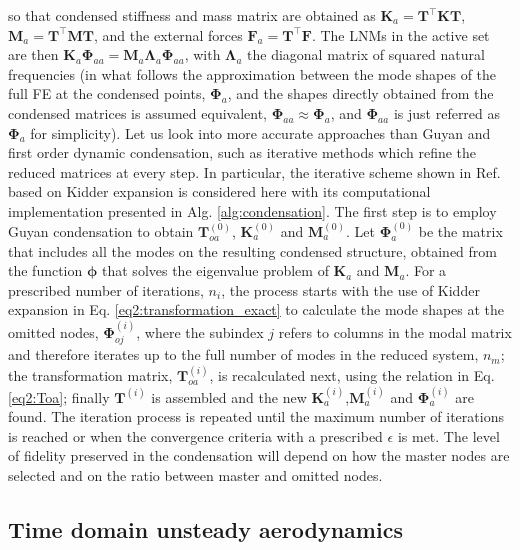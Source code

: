 \documentclass[11pt]{article}
\begin{document}
so that condensed stiffness and mass matrix are obtained as $\pmb{K}_a = \pmb{T}^\top\pmb{K}\pmb{T}$, $\pmb{M}_a = \pmb{T}^\top\pmb{M}\pmb{T}$, and the external forces $\bm{F}_a = \bm{T}^\top \bm{F}$. The LNMs in the active set are then $\pmb{K}_a\pmb{\Phi}_{aa}=\pmb{M}_a\pmb{\Lambda}_a\pmb{\Phi}_{aa}$, with $\pmb{\Lambda}_a$ the diagonal matrix of squared natural frequencies (in what follows the approximation between the mode shapes of the full FE at the condensed points, $\pmb{\Phi}_{a}$, and the shapes directly obtained from the condensed matrices is assumed equivalent, $\pmb{\Phi}_{aa} \approx \pmb{\Phi}_{a}$, and $\pmb{\Phi}_{aa}$ is just referred as $\pmb{\Phi}_{a}$  for simplicity).
Let us look into more accurate approaches than Guyan and first order dynamic condensation, such as iterative methods which refine the reduced matrices at every step. In particular, the iterative scheme shown in Ref.  based on Kidder expansion is considered here with its computational implementation presented in Alg. \eqref{alg:condensation}. The first step is to employ Guyan condensation to obtain $\pmb{T}_{oa}^{(0)}$, $\pmb{K}_a^{(0)}$ and $\pmb{M}_a^{(0)}$. Let $\pmb{\Phi}_{a}^{(0)}$ be the matrix that includes all the modes on the resulting condensed structure, obtained from the function $\bm{\phi}$ that solves the eigenvalue problem of $\pmb{K}_a$ and $\pmb{M}_a$. For a prescribed number of iterations, $n_i$, the process starts with the use of Kidder expansion in Eq. \eqref{eq2:transformation_exact} to calculate the mode shapes at the omitted nodes, $\pmb{\Phi}_{oj}^{(i)}$, where the subindex $j$ refers to columns in the modal matrix and therefore iterates up to the full number of modes in the reduced system, $n_m$; the transformation matrix, $\pmb{T}_{oa}^{(i)}$, is recalculated next, using the relation in Eq. \eqref{eq2:Toa}; finally $\bm{T}^{(i)}$ is assembled and the new $\pmb{K}_a^{(i)}$,$\pmb{M}_a^{(i)}$ and  $\pmb{\Phi}_{a}^{(i)}$ are found. The iteration process is repeated until the maximum number of iterations is reached or when the convergence criteria with a prescribed $\epsilon$ is met. 
The level of fidelity preserved in the condensation will depend on how the master nodes are selected and on the ratio between master and omitted nodes. 

\subsection{Time domain unsteady aerodynamics}
\label{sec:org6655ebd}
\end{document}
